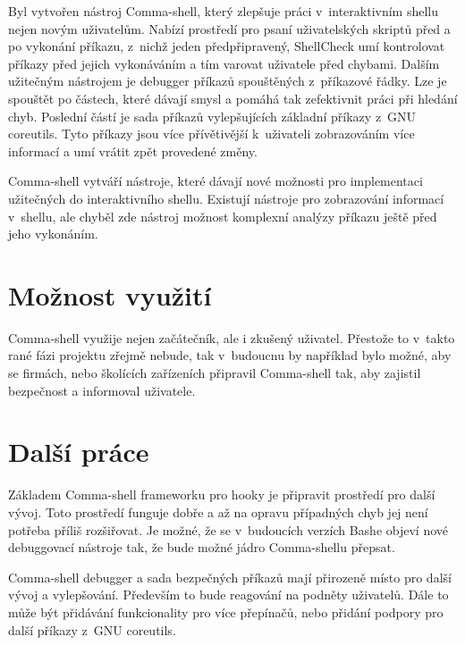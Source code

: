 \documentclass[thesis=M,czech]{FITthesis}[2012/06/26]
\begin{document}
\begin{conclusion}

Byl vytvořen nástroj Comma-shell, který zlepšuje práci v~interaktivním shellu nejen novým uživatelům. Nabízí prostředí pro psaní uživatelských skriptů před a po vykonání příkazu, z~nichž jeden předpřipravený, ShellCheck umí kontrolovat příkazy před jejich vykonáváním a tím varovat uživatele před chybami. Dalším užitečným nástrojem je debugger příkazů spouštěných z~příkazové řádky. Lze je spouštět po částech, které dávají smysl a pomáhá tak zefektivnit práci při hledání chyb. Poslední částí je sada příkazů vylepšujících základní příkazy z~GNU coreutils. Tyto příkazy jsou více přívětivější k~uživateli zobrazováním více informací a umí vrátit zpět provedené změny.

Comma-shell vytváří nástroje, které dávají nové možnosti pro implementaci užitečných do interaktivního shellu. Existují nástroje pro zobrazování informací v~shellu, ale chyběl zde nástroj možnost komplexní analýzy příkazu ještě před jeho vykonáním.


\section{Možnost využití}

Comma-shell využije nejen začátečník, ale i zkušený uživatel. Přestože to v~takto rané fázi projektu zřejmě nebude, tak v~budoucnu by například bylo možné, aby se firmách, nebo školících zařízeních připravil Comma-shell tak, aby zajistil bezpečnost a informoval uživatele.


\section{Další práce}

Základem Comma-shell frameworku pro hooky je připravit prostředí pro další vývoj. Toto prostředí funguje dobře a až na opravu případných chyb jej není potřeba příliš rozšiřovat. Je možné, že se v~budoucích verzích Bashe objeví nové debuggovací nástroje tak, že bude možné jádro Comma-shellu přepsat.

Comma-shell debugger a sada bezpečných příkazů mají přirozeně místo pro další vývoj a vylepšování. Především to bude reagování na podněty uživatelů. Dále to může být přidávání funkcionality pro více přepínačů, nebo přidání podpory pro další příkazy z~GNU coreutils.


\end{conclusion}
\end{document}
